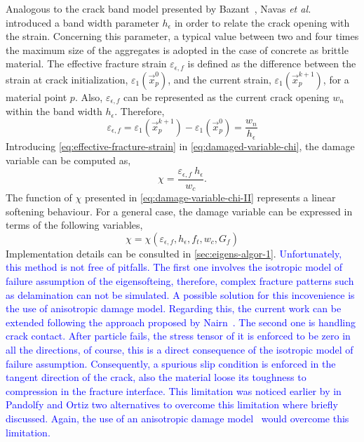 \documentclass[preprint,12pt,a4paper]{elsarticle}
\begin{document}
Analogous to the crack band model presented by
Bazant~\cite{Bazant83}, Navas {\it et al.} \cite{Navas_2018_ES}
\cite{Navas_2017_ES} introduced a band width parameter $h_{\epsilon}$ in order to relate the crack opening with the strain.
Concerning this parameter, a typical value between two and
four times the maximum size of the aggregates is adopted in the case of
concrete as brittle material. The effective fracture strain
$\varepsilon_{\epsilon,f}$ is defined as the difference between the strain at crack initialization,
$\varepsilon_1(\vec{x}_p^{0})$, and the current strain, $\varepsilon_1(\vec{x}_p^{k+1})$, for a material point $p$. Also,
$\varepsilon_{\epsilon,f}$ can be represented as the current crack
opening $w_n$ within the band width $h_{\epsilon}$. Therefore, 
\begin{equation}
  \label{eq:effective-fracture-strain}
  \varepsilon_{\epsilon,f} = \varepsilon_1(\vec{x}_p^{k+1}) -
  \varepsilon_1(\vec{x}_p^{0}) = \frac{w_n}{h_{\epsilon}}
\end{equation}
Introducing \eqref{eq:effective-fracture-strain} in
\eqref{eq:damaged-variable-chi}, the damage variable can be computed
as,
\begin{equation}
  \label{eq:damage-variable-chi-II}
\chi = \frac{\varepsilon_{\epsilon,f}\ h_{\epsilon}}{w_c}.  
\end{equation}
The function of $\chi$ presented in \eqref{eq:damage-variable-chi-II}
represents a linear softening behaviour. For a general case, the
damage variable can be expressed in terms of the following variables,
\begin{equation}
  \label{eq:damage-variable-chi-III}
  \chi = \chi(\varepsilon_{\epsilon,f}, h_{\epsilon}, f_t, w_c, G_f)
\end{equation}
Implementation details can be consulted in \ref{sec:eigens-algor-1}. \textcolor{blue}{Unfortunately, this method is not free of pitfalls. The first one involves the isotropic model of failure assumption of the eigensofteing, therefore, complex fracture patterns such as delamination can not be simulated. A possible solution for this incovenience is the use of anisotropic damage model. Regarding this, the current work can be extended following the approach proposed by Nairn~\cite{NAIRN_2018}. The second one is handling crack contact. After particle fails, the stress tensor of it is enforced to be zero in all the directions, of course, this is a direct consequence of the isotropic model of failure assumption. Consequently, a spurious slip condition is enforced in the tangent direction of the crack, also the material loose its toughness to compression in the fracture interface. This limitation was noticed earlier by in Pandolfy and Ortiz \cite{Pandolfi_2012} two alternatives to overcome this limitation where briefly discussed. Again, the use of an anisotropic damage model~\cite{NAIRN_2018} would overcome this limitation.}
\end{document}
